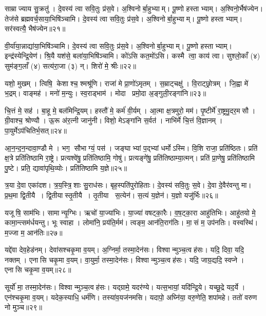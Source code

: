 साम्राज्याय सु॒क्रतु॑।
दे॒वस्य॑ त्वा सवि॒तुः प्र॑स॒वे।
अ॒श्विनोर्बा॒हुभ्याम्।
पू॒ष्णो हस्ताभ्याम्।
अ॒श्विनो॒र्भैष॑ज्येन।
तेज॑से ब्रह्मवर्च॒साया॒भिषि॑ञ्चामि।
दे॒वस्य॑ त्वा सवि॒तुः प्र॑स॒वे।
अ॒श्विनोर्बा॒हुभ्याम्।
पू॒ष्णो हस्ताभ्याम्।
सर॑स्वत्यै॒ भैष॑ज्येन॥२१॥

वी॒र्या॑या॒न्नाद्या॑या॒भिषि॑ञ्चामि।
दे॒वस्य॑ त्वा सवि॒तुः प्र॑स॒वे।
अ॒श्विनोर्बा॒हुभ्याम्।
पू॒ष्णो हस्ताभ्याम्।
इन्द्र॑स्येन्द्रि॒येण॑।
श्रि॒यै यश॑से॒ बला॑या॒भिषि॑ञ्चामि।
को॑ऽसि कत॒मो॑ऽसि।
कस्मै त्वा॒ काय॑ त्वा।
सुश्लो॒काँ (४) सुम॑ङ्ग॒लाँ (४) सत्य॑रा॒जा (३) न्।
शिरो॑ मे॒ श्रीः॥२२॥

यशो॒ मुखम्।
त्विषि॒ केशाश्च॒ श्मश्रू॑णि।
राजा॑ मे प्रा॒णो॑ऽमृतम्।
स॒म्राट्चक्षु॑।
वि॒राट्छ्रोत्रम्।
जि॒ह्वा मे॑ भ॒द्रम्।
वाङ्मह॑।
मनो॑ म॒न्युः।
स्व॒राड्भाम॑।
मोदा प्रमो॒दा अ॒ङ्गुली॒रङ्गा॑नि॥२३॥

चि॒त्तं मे॒ सह॑।
बा॒हू मे॒ बल॑मिन्द्रि॒यम्।
हस्तौ॑ मे॒ कर्म॑ वी॒र्यम्।
आ॒त्मा क्ष॒त्रमुरो॒ मम॑।
पृ॒ष्टीर्मे॑ रा॒ष्ट्रमु॒दर॒मसौ।
ग्री॒वाश्च॒ श्रोण्यौ।
ऊ॒रू अ॑र॒त्नी जानु॑नी।
विशो॒ मेऽङ्गा॑नि स॒र्वत॑।
नाभि॑र्मे चि॒त्तं वि॒ज्ञानम्।
पा॒युर्मेऽप॑चितिर्भ॒सत्॥२४॥

आ॒न॒न्द॒न॒न्दावा॒ण्डौ मे।
भग॒ सौभाग्यं॒ पस॑।
जङ्घाभ्यां प॒द्भ्यां धर्मोऽस्मि।
वि॒शि राजा॒ प्रति॑ष्ठितः।
प्रति॑ क्ष॒त्रे प्रति॑तिष्ठामि रा॒ष्ट्रे।
प्रत्यश्वे॑षु॒ प्रति॑तिष्ठामि॒ गोषु॑।
प्रत्यङ्गे॑षु॒ प्रति॑तिष्ठाम्या॒त्मन्।
प्रति॑ प्रा॒णेषु॒ प्रति॑तिष्ठामि पु॒ष्टे।
प्रति॒ द्यावा॑पृथि॒व्योः।
प्रति॑तिष्ठामि य॒ज्ञे॥२५॥

त्र॒या दे॒वा एका॑दश।
त्र॒य॒स्त्रि॒शाः सु॒राध॑सः।
बृह॒स्पति॑पुरोहिताः।
दे॒वस्य॑ सवि॒तुः स॒वे।
दे॒वा दे॒वैर॑वन्तु मा।
प्र॒थ॒मा द्वि॒तीयै।
द्वि॒तीयास्तृ॒तीयै।
तृ॒तीया स॒त्येन॑।
स॒त्यं य॒ज्ञेन॑।
य॒ज्ञो यजु॑र्भिः॥२६॥

यजूषि॒ साम॑भिः।
सामान्यृ॒ग्भिः।
ऋचो॑ या॒ज्या॑भिः।
या॒ज्या॑ वषट्का॒रैः।
व॒ष॒ट्का॒रा आहु॑तिभिः।
आहु॑तयो मे॒ कामा॒न्त्सम॑र्धयन्तु।
भूः स्वाहा।
लोमा॑नि॒ प्रय॑ति॒र्मम॑।
त्वङ्म॒ आन॑ति॒राग॑तिः।
मा॒सं म॒ उप॑नतिः।
वस्वस्थि॑।
म॒ज्जा म॒ आन॑तिः॥२७॥\anuvakamend[प॒स्त्यास्वा सर॑स्वत्यै॒ भैष॑ज्येन॒ श्रीरङ्गा॑नि भ॒सद्य॒ज्ञे य॒ज्ञो यजु॑र्भि॒रुप॑नति॒र्द्वे च॑]

यद्दे॑वा देव॒हेड॑नम्।
देवा॑सश्चकृ॒मा व॒यम्।
अ॒ग्निर्मा॒ तस्मा॒देन॑सः।
विश्वान्मुञ्च॒त्वह॑सः।
यदि॒ दिवा॒ यदि॒ नक्तम्।
एनासि चकृ॒मा व॒यम्।
वा॒युर्मा॒ तस्मा॒देन॑सः।
विश्वान्मुञ्च॒त्वह॑सः।
यदि॒ जाग्र॒द्यदि॒ स्वप्ने।
एनासि चकृ॒मा व॒यम्॥२८॥

सूर्यो॑ मा॒ तस्मा॒देन॑सः।
विश्वान्मुञ्च॒त्वह॑सः।
यद्ग्रामे॒ यदर॑ण्ये।
यत्स॒भायां॒ यदि॑न्द्रि॒ये।
यच्छू॒द्रे यद॒र्ये।
एन॑श्चकृ॒मा व॒यम्।
यदेक॒स्याधि॒ धर्म॑णि।
तस्या॑व॒यज॑नमसि।
यदापो॒ अघ्नि॑या॒ वरु॒णेति॒ शपा॑महे।
ततो॑ वरुण नो मुञ्च॥२९॥

